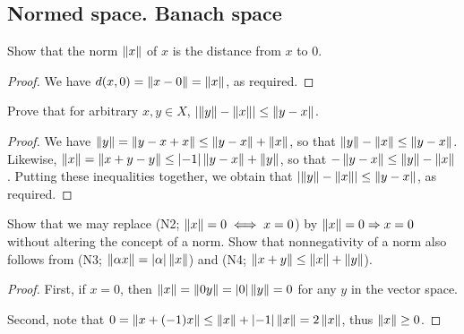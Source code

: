 \subsection{Normed space. Banach space}


\begin{exercise}{1}
Show that the norm $\norm{x}$ of $x$ is the distance from $x$ to 0.
\end{exercise}
\begin{proof}
We have $d(x,0)=\norm{x-0}=\norm{x}$, as required.
\end{proof}

\begin{exercise}{3}
Prove that for arbitrary $x,y\in X$, $\absoluteValue{\norm{y}-\norm{x}}\leq \norm{y-x}$.
\end{exercise}
\begin{proof}
We have $\norm{y} =\norm{y-x+x} \leq\norm{y-x}+\norm{x}$, so that $\norm{y}-\norm{x}\leq\norm{y-x}$. Likewise, $\norm{x} =\norm{x+y-y} \leq\absoluteValue{-1}\norm{y-x}+\norm{y}$, so that $-\norm{y-x}\leq\norm{y}-\norm{x}$. Putting these inequalities together, we obtain that $\absoluteValue{\norm{y}-\norm{x}}\leq\norm{y-x}$, as required.
\end{proof}

\begin{exercise}{4}
Show that we may replace (N2; $\norm{x}=0\iff x=0$) by $\norm{x}=0\Rightarrow x=0$ without altering the concept of a norm. Show that nonnegativity of a norm also follows from (N3; $\norm{\alpha x}=\absoluteValue{\alpha}\norm{x}$) and (N4; $\norm{x+y}\leq \norm{x}+\norm{y}$).
\end{exercise}
\begin{proof}
First, if $x=0$, then $\norm{x} =\norm{0y} =\absoluteValue{0}\norm{y} =0$ for any $y$ in the vector space.

Second, note that $0=\norm{x+(-1)x}\leq \norm{x}+\absoluteValue{-1}\norm{x} =2\norm{x}$, thus $\norm{x}\geq 0$.
\end{proof}

